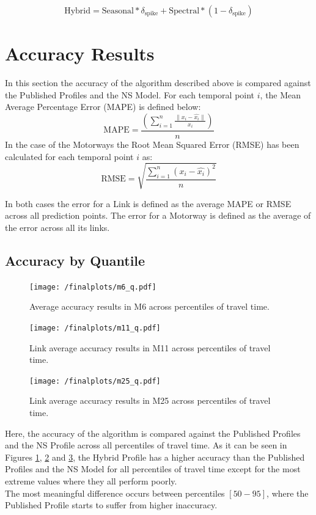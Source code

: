 \documentclass[conference, letterpaper]{IEEEtran}
\begin{document}
\begin{equation}
\textrm{Hybrid} = \textrm{Seasonal} * \delta_{\textrm{spike}} + \textrm{Spectral} * (1 - \delta_{\textrm{spike}})
\end{equation}

\section{Accuracy Results}
In this section the accuracy of the algorithm described above is compared against the Published Profiles and the NS Model. 
For each temporal point $i$, the Mean Average Percentage Error (MAPE) is defined below:
\begin{equation}
\textrm{MAPE} =\frac{ \left( \sum_{i=1}^{n} \frac{\|x_i - \hat{x_i}\|}{x_i}\right)}{n}
\end{equation}
In the case of the Motorways the Root Mean Squared Error (RMSE) has been calculated for each temporal point $i$ as:
\begin{equation}
\textrm{RMSE} = \sqrt{\frac{\sum_{i=1}^{n} (x_i - \hat{x_i})^2}{n}}
\end{equation}

In both cases the error for a Link is defined as the average MAPE or RMSE across all prediction points.
The error for a Motorway is defined as the average of the error across all its links.
\subsection{Accuracy by Quantile}
\begin{figure}[htbp]
	\centerline{\texttt{[image: /finalplots/m6\_q.pdf]}}
	\caption{Average accuracy results in M6 across percentiles of travel time.}
	\label{fig:m6q}
\end{figure}

\begin{figure}[htbp]
	\centering
	\texttt{[image: /finalplots/m11\_q.pdf]}
	\caption{Link average accuracy results in M11 across percentiles of travel time.}
	\label{fig:m11q}
\end{figure}

\begin{figure}[htbp]
	\centering
	\texttt{[image: /finalplots/m25\_q.pdf]}
	\caption{Link average accuracy results in M25 across percentiles of travel time.}
	\label{fig:m25q}
\end{figure}
Here, the accuracy of the algorithm is compared against the Published Profiles and the NS Profile across all percentiles of travel time.
As it can be seen in Figures \ref{fig:m6q}, \ref{fig:m11q} and \ref{fig:m25q}, the Hybrid Profile has a higher accuracy than the Published Profiles and the NS Model for all percentiles of travel time except for the most extreme values where they all perform poorly.\\
The most meaningful difference occurs between percentiles $[50-95]$, where the Published Profile starts to suffer from higher inaccuracy.
\end{document}
